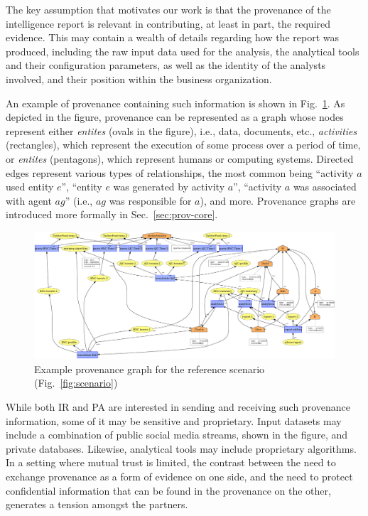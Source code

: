 %
The  key assumption that motivates our work is that the provenance of the intelligence report is relevant in contributing, at least in part, the required evidence. This may contain a wealth of details regarding how the report was produced, including the raw input data used for the analysis, the analytical tools and their configuration parameters, as well as the identity of the analysts involved, and their position within the business organization.  

%
An example of provenance containing such information is shown in Fig.~\ref{fig:graph-example}.
%
As depicted in the figure, provenance can be represented as a graph whose nodes represent either \textit{entites} (ovals in the figure), i.e., data, documents, etc., \textit{activities} (rectangles), which represent the execution of some process over a period of time, or \textit{entites} (pentagons), which represent  humans or computing systems. Directed edges represent various types of relationships, the most common being ``activity $a$ used entity $e$'', ``entity $e$ was generated by activity $a$'', ``activity $a$ was associated with agent $ag$'' (i.e., $ag$ was responsible for $a$), and more.
%
Provenance graphs are introduced more formally in Sec.~\ref{sec:prov-core}.

\begin{figure}
\begin{center}
\includegraphics[width=\textwidth]{figures/IR-agents-delegation.pdf}
\caption{Example provenance graph for the reference scenario (Fig.~\ref{fig:scenario})}
\label{fig:graph-example}
\end{center}
\end{figure}

%
While both IR and PA are interested in sending and receiving such provenance information, some of it may be sensitive and proprietary. 
%
Input datasets may include a combination of public social media streams, shown in the figure, and private databases. Likewise, analytical tools may include proprietary algorithms.
%
In a setting where mutual trust is limited, the contrast between the need to exchange provenance as a form of evidence on one side, and the need to protect confidential information that can be found in the provenance on the other, generates a tension amongst the partners.

